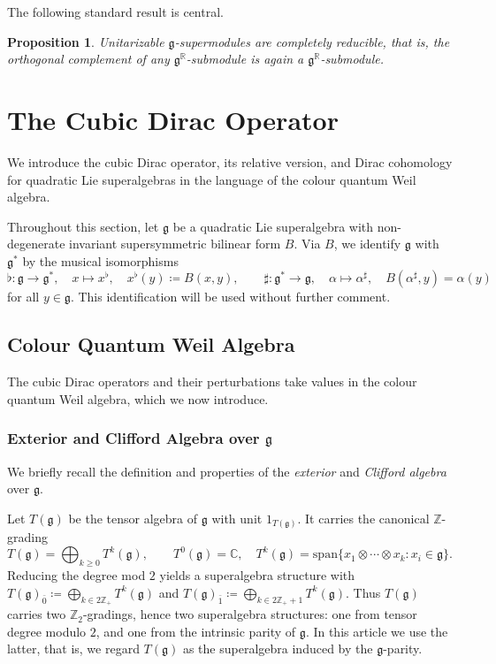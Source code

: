 \documentclass[11pt]{amsart}
\def\CC{{\mathbb C}}
\def\RR{{\mathbb R}}
\def\gg{{\mathfrak{g}}}
\def\ZZ{{\mathbb Z}}
\theoremstyle{plain}
\newtheorem{proposition}[theorem]{Proposition}
\theoremstyle{remark}
\theoremstyle{definition}
\numberwithin{equation}{section}
\theoremstyle{remark}
\begin{document}
The following standard result is central.

\begin{proposition}\label{prop::unitarizable_completely_reducible}
Unitarizable $\gg$-supermodules are completely reducible, that is, the orthogonal complement of any $\gg^{\RR}$-submodule is again a $\gg^{\RR}$-submodule.
\end{proposition}

\section{The Cubic Dirac Operator} \label{sec::cubic_Dirac_operator}
We introduce the cubic Dirac operator, its relative version, and Dirac cohomology for quadratic Lie superalgebras in the language of the colour quantum Weil algebra.

Throughout this section, let $\gg$ be a quadratic Lie superalgebra with non-degenerate invariant supersymmetric bilinear form $B$. Via $B$, we identify $\gg$ with $\gg^{*}$ by the musical isomorphisms
\begin{equation}\label{eq::musical_isomorphisms}
\flat:\gg\to\gg^{*},\quad x\mapsto x^{\flat},\quad x^{\flat}(y)\coloneqq B(x,y),\qquad
\sharp:\gg^{*}\to\gg,\quad \alpha\mapsto\alpha^{\sharp},\quad B(\alpha^{\sharp},y)=\alpha(y)
\end{equation}
for all $y\in\gg$. This identification will be used without further comment.

\subsection{Colour Quantum Weil Algebra} The cubic Dirac operators and their perturbations take values in the colour quantum Weil algebra, which we now introduce.

\subsubsection{Exterior and Clifford Algebra over \texorpdfstring{$\gg$}{}} \label{subsec::exterior_and_clifford_superalgebra} We briefly recall the definition and properties of the \emph{exterior} and \emph{Clifford algebra} over $\gg$.

Let $T(\gg)$ be the tensor algebra of $\gg$ with unit $1_{T(\gg)}$. It carries the canonical $\ZZ$-grading
\begin{equation}
T(\gg)=\bigoplus_{k\ge 0}T^{k}(\gg),\qquad T^{0}(\gg)=\CC,\quad
T^{k}(\gg)=\mathrm{span}\{x_{1}\otimes\cdots\otimes x_{k}:x_i\in\gg\}.
\end{equation}
Reducing the degree mod $2$ yields a superalgebra structure with $T(\gg)_{\bar{0}}\coloneqq \bigoplus_{k\in 2\ZZ_{+}}T^{k}(\gg)$ and $
T(\gg)_{\bar{1}}\coloneqq \bigoplus_{k\in 2\ZZ_{+}+1}T^{k}(\gg).$ Thus $T(\gg)$ carries two $\ZZ_{2}$-gradings, hence two superalgebra structures: one from tensor degree modulo $2$, and one from the intrinsic parity of $\gg$. In this article we use the latter, that is, we regard $T(\gg)$ as the superalgebra induced by the $\gg$-parity.
\medskip
\end{document}
